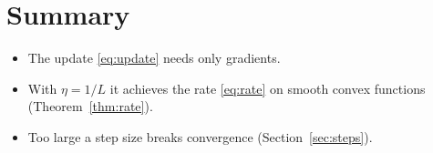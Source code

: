 \documentclass[11pt]{article}
\begin{document}
\section{Summary}

\begin{itemize}
	\item The update \eqref{eq:update} needs only gradients.
	\item With $\eta = 1/L$ it achieves the rate \eqref{eq:rate} on smooth convex functions (Theorem~\ref{thm:rate}).
	\item Too large a step size breaks convergence (Section~\ref{sec:steps}).
\end{itemize}



\end{document}
